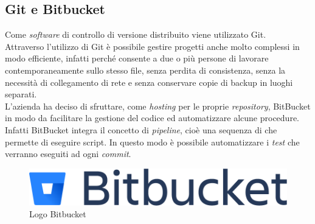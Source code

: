     \subsection{Git e Bitbucket}
      Come \textit{software} di controllo di versione distribuito viene utilizzato Git.\\
      Attraverso l'utilizzo di Git è possibile gestire progetti anche molto complessi in modo efficiente, infatti perché consente a due o più persone di lavorare contemporaneamente sullo stesso file, senza perdita di consistenza, senza la necessità di collegamento di rete e senza conservare copie di backup in luoghi separati.\\
      L'azienda ha deciso di sfruttare, come \textit{hosting} per le proprie \textit{repository}, BitBucket in modo da facilitare la gestione del codice ed automatizzare alcune procedure.\\
      Infatti BitBucket integra il concetto di \textit{pipeline}, cioè una sequenza di  che permette di eseguire script. In questo modo è possibile automatizzare i \textit{test} che verranno eseguiti ad ogni \textit{commit}.
      \begin{figure}[h]
        \centering
        \includegraphics[scale=0.3]{immagini/bitbucket.png}
        \caption{Logo Bitbucket}
        \label{bit}
      \end{figure}
